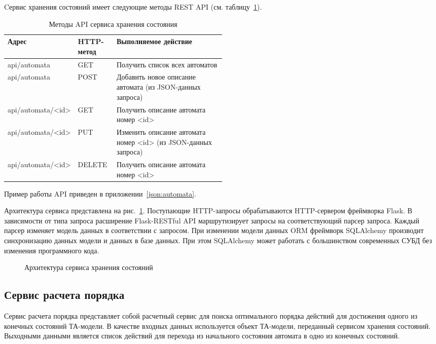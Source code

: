 Cервис хранения состояний имеет следующие методы REST API (см. таблицу~\ref{tab:automata}).
\begin{table} [htbp]
  \centering
  \parbox{15cm}{\caption{Методы API сервиса хранения состояния}\label{tab:automata}}
  \begin{center}
  \begin{tabular}{| l | l | p{0.5\linewidth} |}
  \hline
  Адрес & HTTP-метод & Выполняемое действие\\
  \hline
  api/automata & GET & Получить список всех автоматов\\
  \hline
  api/automata & POST & Добавить новое описание автомата (из JSON-данных запроса)\\
  \hline
  api/automata/<id> & GET & Получить описание автомата номер <id>\\
  \hline
  api/automata/<id> & PUT & Изменить описание автомата номер <id> (из JSON-данных запроса)\\
  \hline
  api/automata/<id> & DELETE & Получить описание автомата номер <id>\\
  \hline
  \end{tabular}
  \end{center}
\end{table}
Пример работы API приведен в приложении~\ref{json:automata}.

Архитектура сервиса представлена на рис.~\ref{pic:automata-arch}.
Поступающие HTTP-запросы обрабатываются HTTP-сервером фреймворка Flask.
В зависимости от типа запроса расширение Flask-RESTful API маршрутизирует запросы на соответствующий парсер запроса.
Каждый парсер изменяет модель данных в соответствии с запросом.
При изменении модели данных ORM фреймворк SQLAlchemy производит синхронизацию данных модели и данных в базе данных.
При этом SQLAlchemy может работать с большинством современных СУБД без изменения программного кода.

\begin{figure}[ht]
\caption{Архитектура сервиса хранения состояний}
\label{pic:automata-arch}
\end{figure}

\subsection{Сервис расчета порядка}

Сервис расчета порядка представляет собой расчетный сервис для поиска оптимального порядка действий для достижения одного из конечных состояний ТА-модели.
В качестве входных данных используется объект ТА-модели, переданный сервисом хранения состояний.
Выходными данными является список действий для перехода из начального состояния автомата в одно из конечных состояний.

